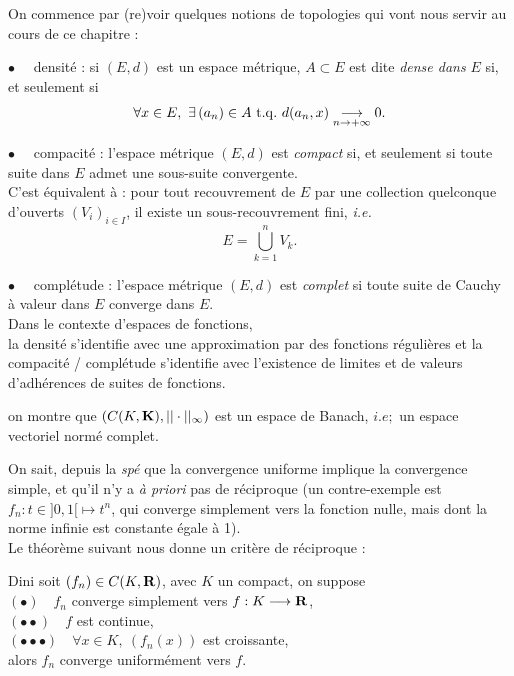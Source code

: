 \documentclass[a4paper,11pt, twoside]{article}
\begin{document}
\pagestyle{TestPage}



On commence par (re)voir quelques notions de topologies qui vont nous servir au cours de ce chapitre :



$\bullet\quad$ densité : si $(E,d)$ est un espace métrique, $A\subset E$ est dite \emph{dense dans }$E$ si, et seulement si 
$$\forall x\in E,\ \exists \left(a_n\right)\in A\ \mathrm{t.q.}\ d(a_n,x)\tend 0.$$

$\bullet\quad$ compacité : l'espace métrique $(E,d)$ est \emph{compact} si, et seulement si toute suite dans $E$ admet une sous-suite convergente.\\
C'est équivalent à : pour tout recouvrement de $E$ par une collection quelconque d'ouverts $\left(V_i\right)_{i\in I}$, il existe un sous-recouvrement fini, \emph{i.e.} 
$$E=\bigcup_{k=1}^nV_k.$$

$\bullet\quad$ complétude :  l'espace métrique $(E,d)$ est \emph{complet} si toute suite de Cauchy à valeur dans $E$ converge dans $E$.\\

Dans le contexte d'espaces de fonctions,\\
la densité s'identifie avec une approximation par des fonctions régulières et la compacité / complétude s'identifie avec l'existence de limites et de valeurs d'adhérences de suites de fonctions.\\


\setcounter{CompteurRemarque}{0}
\begin{RQ}
  on montre que $\left(C(K,\mathbf K),||\cdot||_{\infty}\right)$ est un espace de Banach, $i.e;$ un espace vectoriel normé complet.
\end{RQ} 





On sait, depuis la \emph{spé} que la convergence uniforme implique la convergence simple, et qu'il n'y a \emph{à priori} pas de réciproque (un contre-exemple est $f_n :t\in ]0,1[ \longmapsto t^n$, qui converge simplement vers la fonction nulle, mais dont la norme infinie est constante égale à 1).\\
Le théorème suivant nous donne un critère de réciproque :\\


\begin{thC}{Dini}
  soit $\left(f_n\right)\in C(K,\mathbf R)$, avec $K$ un compact, on suppose\\
  $(\bullet)\quad f_n$ converge simplement vers $f:K\longrightarrow\mathbf R$,\\
  $(\bullet\bullet)\quad f$ est continue,\\
  $(\bullet\bullet\bullet)\quad \forall x\in K,\ \left(f_n(x)\right)$ est croissante,\\

  alors $f_n$ converge uniformément vers $f$.
\end{thC}
\end{document}
